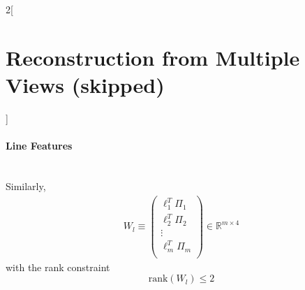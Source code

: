 \documentclass[oneside,fontsize=11pt,paper=a4]{scrartcl}
\begin{document}
\begin{multicols}{2}[\section{Reconstruction from Multiple Views (skipped)}]
\paragraph{Line Features} \mbox{}\\
Similarly, 
\begin{equation*}
\begin{split}
    W_l \equiv \begin{pmatrix} \ell_1^T \Pi_1 \\ \ell_2^T \Pi_2 \\ \vdots \\ \ell_m^T \Pi_m \\\end{pmatrix} \in \mathbb{R}^{m \times 4}
\end{split}
\end{equation*}
with the rank constraint
\begin{equation*}
    \text{rank}(W_l) \leq 2
\end{equation*}



\end{multicols}
\end{document}
